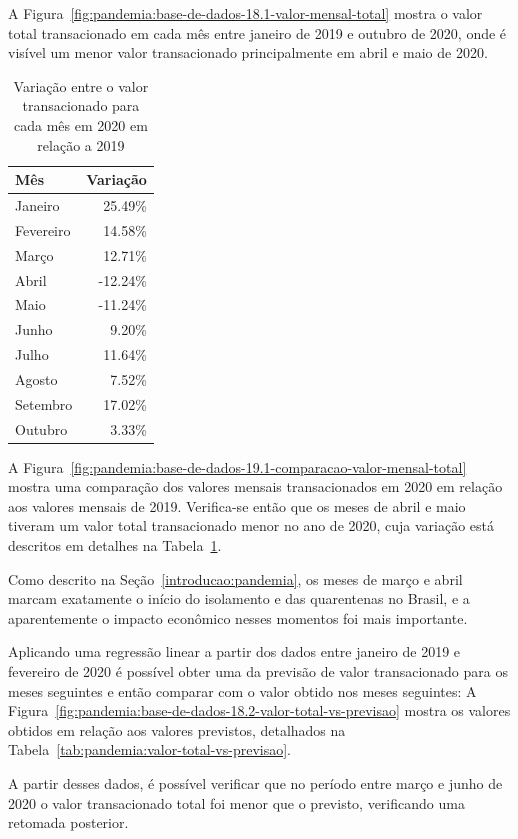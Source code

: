 A Figura~\ref{fig:pandemia:base-de-dados-18.1-valor-mensal-total} mostra o valor total transacionado em cada mês entre janeiro de 2019 e outubro de 2020, onde é visível um menor valor transacionado principalmente em abril e maio de 2020.

\begin{table}[htb]
\centering
\caption{Variação entre o valor transacionado para cada mês em 2020 em relação a 2019}
\label{tab:comparacao-valor-mensal-total}
\begin{tabular}{lr}
\toprule
Mês & Variação \\
\midrule
Janeiro &   25.49\% \\
Fevereiro & 14.58\% \\
Março &     12.71\% \\
Abril &    -12.24\% \\
Maio &     -11.24\% \\
Junho &      9.20\% \\
Julho &     11.64\% \\
Agosto &     7.52\% \\
Setembro &  17.02\% \\
Outubro &    3.33\% \\
\bottomrule
\end{tabular}
\fdadospesquisa
\end{table}

A Figura~\ref{fig:pandemia:base-de-dados-19.1-comparacao-valor-mensal-total} mostra uma comparação dos valores mensais transacionados em 2020 em relação aos valores mensais de 2019. Verifica-se então que os meses de abril e maio tiveram um valor total transacionado menor no ano de 2020, cuja variação está descritos em detalhes na Tabela~\ref{tab:comparacao-valor-mensal-total}.

Como descrito na Seção~\ref{introducao:pandemia}, os meses de março e abril marcam exatamente o início do isolamento e das quarentenas no Brasil, e a aparentemente o impacto econômico nesses momentos foi mais importante.

Aplicando uma regressão linear a partir dos dados entre janeiro de 2019 e fevereiro de 2020 é possível obter uma da previsão de valor transacionado para os meses seguintes e então comparar com o valor obtido nos meses seguintes: A Figura~\ref{fig:pandemia:base-de-dados-18.2-valor-total-vs-previsao} mostra os valores obtidos em relação aos valores previstos, detalhados na Tabela~\ref{tab:pandemia:valor-total-vs-previsao}.

A partir desses dados, é possível verificar que no período entre março e junho de 2020 o valor transacionado total foi menor que o previsto, verificando uma retomada posterior.

